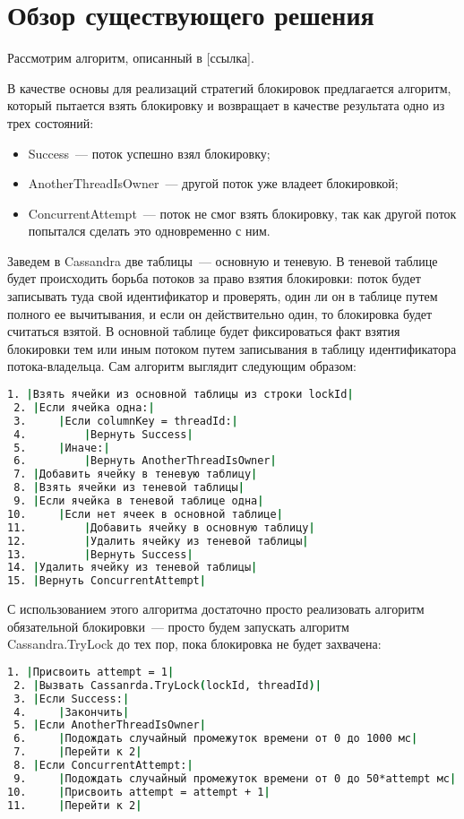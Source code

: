 \section{Обзор существующего решения}

Рассмотрим алгоритм, описанный в [ссылка].

В качестве основы для реализаций стратегий блокировок предлагается алгоритм, который пытается взять блокировку и возвращает в качестве результата одно из трех состояний:

\begin{itemize}
	\item Success~--- поток успешно взял блокировку;
	\item AnotherThreadIsOwner~--- другой поток уже владеет блокировкой;
	\item ConcurrentAttempt~--- поток не смог взять блокировку, так как другой поток попытался сделать это одновременно с ним.
\end{itemize}

Заведем в Cassandra две таблицы~--- основную и теневую. В теневой таблице будет происходить борьба потоков за право взятия блокировки: поток будет записывать туда свой идентификатор и проверять, один ли он в таблице путем полного ее вычитывания, и если он действительно один, то блокировка будет считаться взятой. В основной таблице будет фиксироваться факт взятия блокировки тем или иным потоком путем записывания в таблицу идентификатора потока-владельца.
Сам алгоритм выглядит следующим образом:


\begin{lstlisting}[language=csh,caption={Алгоритм Cassandra.TryLock(lockId, threadId)}]
 1. |Взять ячейки из основной таблицы из строки lockId|
 2. |Если ячейка одна:|
 3. 	|Если columnKey = threadId:|
 4. 		|Вернуть Success|
 5. 	|Иначе:|
 6. 		|Вернуть AnotherThreadIsOwner|
 7. |Добавить ячейку в теневую таблицу|
 8. |Взять ячейки из теневой таблицы|
 9. |Если ячейка в теневой таблице одна|
10. 	|Если нет ячеек в основной таблице|
11. 		|Добавить ячейку в основную таблицу|
12. 		|Удалить ячейку из теневой таблицы|
13. 		|Вернуть Success|
14. |Удалить ячейку из теневой таблицы|
15. |Вернуть ConcurrentAttempt|
\end{lstlisting}

С использованием этого алгоритма достаточно просто реализовать алгоритм обязательной блокировки~--- просто будем запускать алгоритм Cassandra.TryLock до тех пор, пока блокировка не будет захвачена:

\begin{lstlisting}[language=csh,caption={Алгоритм Cassandra.GetLock(lockId, threadId)}]
 1. |Присвоить attempt = 1|
 2. |Вызвать Cassanrda.TryLock(lockId, threadId)|
 3. |Если Success:|
 4. 	|Закончить|
 5. |Если AnotherThreadIsOwner|
 6. 	|Подождать случайный промежуток времени от 0 до 1000 мс|
 7. 	|Перейти к 2|
 8. |Если ConcurrentAttempt:|
 9. 	|Подождать случайный промежуток времени от 0 до 50*attempt мс|
10. 	|Присвоить attempt = attempt + 1|
11. 	|Перейти к 2|
\end{lstlisting}

